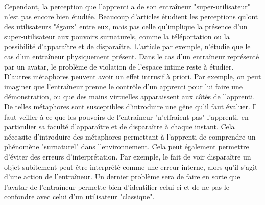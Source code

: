 \documentclass[11pt]{article}
\begin{document}
Cependant, la perception que l'apprenti a de son entraîneur "super-utilisateur" n'est pas encore bien étudiée. Beaucoup d'articles étudient les perceptions qu'ont des utilisateurs "égaux" entre eux, mais pas celle qu'implique la présence d'un super-utilisateur aux pouvoirs surnaturels, comme la téléportation ou la possibilité d'apparaître et de disparaître. L'article \cite{show-through} par exemple, n'étudie que le cas d'un entraîneur physiquement présent. Dans le cas d'un entraîneur représenté par un avatar, le problème de violation de l'espace intime reste à étudier. D'autres métaphores peuvent avoir un effet intrusif à priori. Par exemple, on peut imaginer que l'entraîneur prenne le contrôle d'un apprenti pour lui faire une démonstration, ou que des mains virtuelles apparaissent aux côtés de l'apprenti. De telles métaphores sont susceptibles d'introduire une gêne qu'il faut évaluer. Il faut veiller à ce que les pouvoirs de l'entraîneur "n'effraient pas" l'apprenti, en particulier sa faculté d'apparaître et de disparaître à chaque instant. Cela nécessite d'introduire des métaphores permettant à l'apprenti de comprendre un phénomène "surnaturel" dans l'environnement. Cela peut également permettre d'éviter des erreurs d'interprétation. Par exemple, le fait de voir disparaître un objet subitement peut être interprété comme une erreur interne, alors qu'il s'agit d'une action de l'entraîneur. Un dernier problème sera de faire en sorte que l'avatar de l'entraîneur permette bien d'identifier celui-ci et de ne pas le confondre avec celui d'un utilisateur "classique".


 
\end{document}
